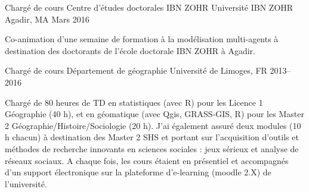 \begin{cventries}
\cventry
  {Chargé de cours} %
  {Centre d'études doctorales IBN ZOHR} %
  {Université IBN ZOHR Agadir, MA} %
  {Mars 2016} %
  {
    \begin{cvitems} %
      Co-animation d'une semaine de formation à la modélisation multi-agents à destination des doctorants de l'école doctorale IBN ZOHR à Agadir.
    \end{cvitems}
  }


\cventry
  {Chargé de cours} %
  {Département de géographie} %
  {Université de Limoges, FR} %
  {2013--2016} %
  {
    \begin{cvitems} %
    Chargé de 80 heures de TD en statistiques (avec R) pour les Licence 1 Géographie (40 h), et en géomatique (avec Qgis, GRASS‑GIS, R) pour les Master 2 Géographie/Histoire/Sociologie (20 h). J’ai également assuré deux modules (10 h chacun) à destination des Master 2 SHS et portant sur l’acquisition d’outils et méthodes de recherche innovants en sciences sociales : jeux sérieux et analyse de réseaux sociaux. A chaque fois, les cours étaient en présentiel et accompagnés d’un support électronique sur la plateforme d’e‑learning (moodle 2.X) de l’université.
    \end{cvitems}
  }


\end{cventries}
